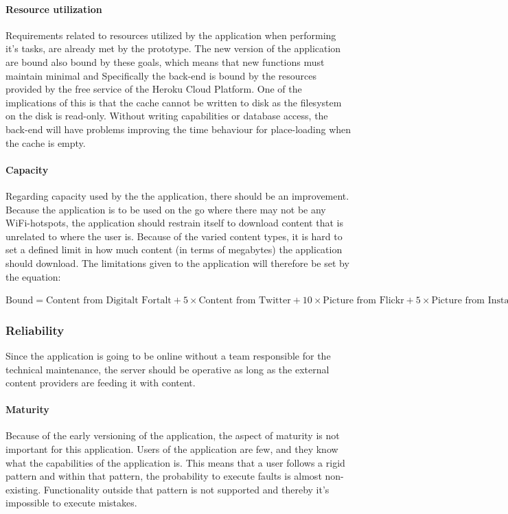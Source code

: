 \paragraph{Resource utilization}
Requirements related to resources utilized by the application when performing it's tasks, are already met by the prototype. The new version of the application are bound also bound by these goals, which means that new functions must maintain minimal and  Specifically the back-end is bound by the resources provided by the free service of the Heroku Cloud Platform. One of the implications of this is that the cache cannot be written to disk as the filesystem on the disk is read-only. Without writing capabilities or database access, the back-end will have problems improving the time behaviour for place-loading when the cache is empty.

\paragraph{Capacity}
Regarding capacity used by the the application, there should be an improvement. Because the application is to be used on the go where there may not be any WiFi-hotspots, the application should restrain itself to download content that is unrelated to where the user is. Because of the varied content types, it is hard to set a defined limit in how much content (in terms of megabytes) the application should download. The limitations given to the application will therefore be set by the equation: \\ 
\begin{center} 
$\textrm{Bound}=\textrm{Content from Digitalt Fortalt}+5\times\textrm{Content from Twitter}+10\times\textrm{Picture from Flickr}+5\times\textrm{Picture from Instagram}$
\end{center}

\subsubsection{Reliability}
Since the application is going to be online without a team responsible for the technical maintenance, the server should be operative as long as the external content providers are feeding it with content. 

\paragraph{Maturity}
Because of the early versioning of the application, the aspect of maturity is not important for this application. Users of the application are few, and they know what the capabilities of the application is. This means that a user follows a rigid pattern and within that pattern, the probability to execute faults is almost non-existing. Functionality outside that pattern is not supported and thereby it's impossible to execute mistakes.

